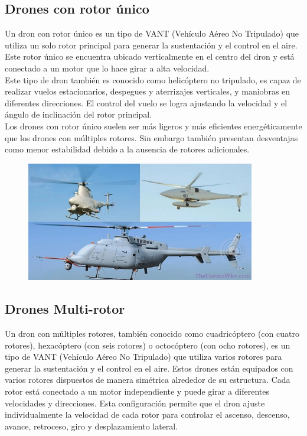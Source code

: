 \documentclass{article}
\begin{document}

\subsection{Drones con rotor único}

Un dron con rotor único es un tipo de VANT (Vehículo Aéreo No Tripulado) que utiliza un solo rotor principal para generar la sustentación y el control en el aire. Este rotor único se encuentra ubicado verticalmente en el centro del dron y está conectado a un motor que lo hace girar a alta velocidad.\\

Este tipo de dron también es conocido como helicóptero no tripulado, es capaz de realizar vuelos estacionarios, despegues y aterrizajes verticales, y maniobras en diferentes direcciones. El control del vuelo se logra ajustando la velocidad y el ángulo de inclinación del rotor principal.\\

Los drones con rotor único suelen ser más ligeros y más eficientes energéticamente que los drones con múltiples rotores. Sin embargo también presentan desventajas como menor estabilidad debido a la ausencia de rotores adicionales.

\begin{figure}[h]
  \includegraphics[width=10cm]{images/single_rotor.jpg}
  \centering
\end{figure}


\subsection{Drones Multi-rotor}

Un dron con múltiples rotores, también conocido como cuadricóptero (con cuatro rotores), hexacóptero (con seis rotores) o octocóptero (con ocho rotores), es un tipo de VANT (Vehículo Aéreo No Tripulado) que utiliza varios rotores para generar la sustentación y el control en el aire. Estos drones están equipados con varios rotores dispuestos de manera simétrica alrededor de su estructura. Cada rotor está conectado a un motor independiente y puede girar a diferentes velocidades y direcciones. Esta configuración permite que el dron ajuste individualmente la velocidad de cada rotor para controlar el ascenso, descenso, avance, retroceso, giro y desplazamiento lateral.\\
\end{document}
